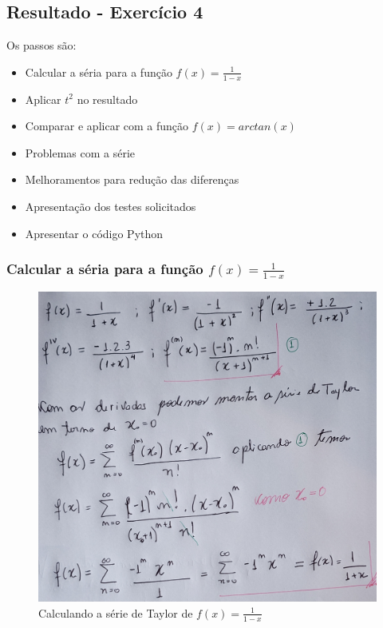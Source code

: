 \subsection{Resultado - Exercício 4}

Os passos são:
\begin{itemize}[leftmargin=3.5em, itemsep=-.5mm, topsep=0.5mm]
    \item Calcular a séria para a função $f(x) = \frac{1}{1 - x}$
    \item Aplicar $t^2$ no resultado
    \item Comparar e aplicar com a função $f(x) = arctan(x)$
    \item Problemas com a série
    \item Melhoramentos para redução das diferenças
    \item Apresentação dos testes solicitados
    \item Apresentar o código Python
\end{itemize}

\subsubsection{Calcular a séria para a função $f(x) = \frac{1}{1 - x}$}
\begin{figure}[H]
    \centering
    \includegraphics[width=1.1\textwidth]{imagens/exercicio4_parte1}
    \caption{Calculando a série de Taylor de $f(x) = \frac{1}{1 - x}$}
    \label{fig:exe4_parte1}
\end{figure}

